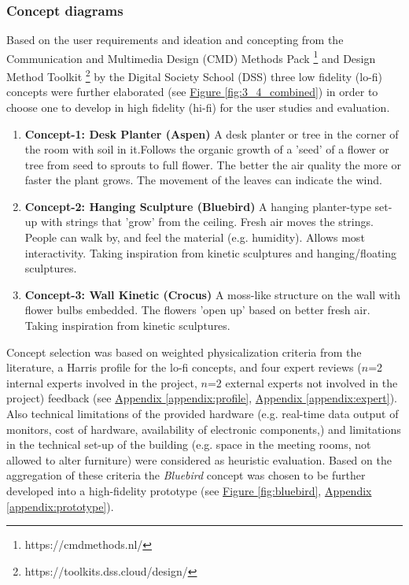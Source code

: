 \subsubsection{Concept diagrams}

Based on the user requirements and ideation and concepting from the Communication and Multimedia Design (CMD) Methods Pack \footnote{https://cmdmethods.nl/} and Design Method Toolkit \footnote{https://toolkits.dss.cloud/design/} by the Digital Society School (DSS) three low fidelity (lo-fi) concepts were further elaborated (see \hyperref[fig:3_4_combined]{Figure \ref*{fig:3_4_combined}}) in order to choose one to develop in high fidelity (hi-fi) for the user studies and evaluation. 


\begin{enumerate}
  \item \textbf{Concept-1: Desk Planter (Aspen)}
      A desk planter or tree in the corner of the room with soil in it.Follows the organic growth of a 'seed' of a flower or tree from seed to sprouts to full flower. The better the air quality the more or faster the plant grows. The movement of the leaves can indicate the wind.

  \item \textbf{Concept-2: Hanging Sculpture (Bluebird)}
      A hanging planter-type set-up with strings that 'grow' from the ceiling. Fresh air moves the strings. People can walk by, and feel the material (e.g. humidity). Allows most interactivity. Taking inspiration from kinetic sculptures and hanging/floating sculptures.

  \item \textbf{Concept-3: Wall Kinetic (Crocus)}
      A moss-like structure on the wall with flower bulbs embedded. The flowers 'open up' based on better fresh air. Taking inspiration from kinetic sculptures.
\end{enumerate}


Concept selection was based on weighted physicalization criteria from the literature, a Harris profile for the lo-fi concepts, and four expert reviews ($n$=2 internal experts involved in the project, $n$=2 external experts not involved in the project) feedback (see \hyperref[appendix:profile]{Appendix \ref*{appendix:profile}}, \hyperref[appendix:expert]{Appendix \ref*{appendix:expert}}). Also technical limitations of the provided hardware (e.g. real-time data output of monitors, cost of hardware, availability of electronic components,) and limitations in the technical set-up of the building (e.g. space in the meeting rooms, not allowed to alter furniture) were considered as heuristic evaluation. Based on the aggregation of these criteria the \textit{Bluebird} concept was chosen to be further developed into a high-fidelity prototype (see \hyperref[fig:bluebird]{Figure \ref*{fig:bluebird}}, \hyperref[appendix:prototype]{Appendix \ref*{appendix:prototype}}).


